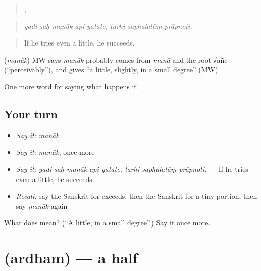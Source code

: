 \begin{quote}
    ,   
\end{quote}

\begin{quote}
\emph{yadi saḥ manāk api yatate, tarhi saphalatāṃ prāpnoti.}
\end{quote}

\begin{quote}
If he tries even a little, he succeeds.
\end{quote}

\begin{cousinweb}
\textbf{} (\emph{manāk}) MW says \emph{manāk} probably comes from \emph{manā} and the root √añc (\textquotedblleft{}perceivably\textquotedblright{}), and gives \textquotedblleft{}a little, slightly, in a small degree\textquotedblright{} (MW).
\end{cousinweb}

\begin{grammarlens}[title={What you've built}]
One more word for saying what happens if.
\end{grammarlens}

\subsection*{Your turn}
\begin{itemize}
\raggedright
  \item \emph{Say it:} \emph{manāk}
  \item \emph{Say it:} \emph{manāk}, once more
  \item \emph{Say it:} \emph{yadi saḥ manāk api yatate, tarhi saphalatāṃ prāpnoti.} — If he tries even a little, he succeeds.
  \item \emph{Recall:} say the Sanskrit for exceeds, then the Sanskrit for a tiny portion, then say \emph{manāk} again
\end{itemize}

\begin{tcolorbox}[breakable,colback=teal!4,colframe=teal!35!black,title={Before you move on}]
What does  mean? (\textquotedblleft{}A little; in a small degree\textquotedblright{}.) Say it once more.
\end{tcolorbox}
\section[\texorpdfstring{\sk{अर्धम्} (ardham)}{अर्धम् (ardham)}]{ (ardham) — a half}

